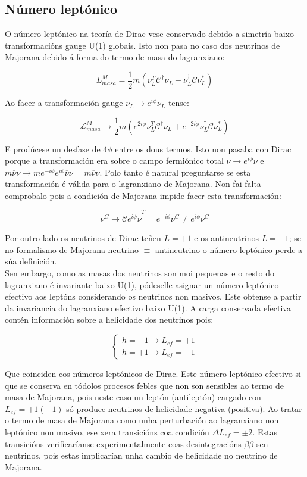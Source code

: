 \documentclass[a4paper,10pt]{article}
\newcommand{\beq}{\begin{equation}}
\newcommand{\eeq}{\end{equation}}
\newcommand{\bc}{\begin{cases}}
\newcommand{\ec}{\end{cases}}
\newcommand{\barra}[1]{\overline{#1}}
\newcommand{\h}[1]{#1^\dagger}
\newcommand{\chula}[1]{\mathcal{#1}}
\begin{document}
\subsection{Número leptónico}

O número leptónico na teoría de Dirac vese conservado debido a simetría baixo transformacións gauge U(1) globais. Isto non pasa no caso dos neutrinos de Majorana debido á forma do termo de masa do lagranxiano:

\beq
L_{masa}^M = \frac{1}{2} m \left( \nu_L^T \chula C^\dag \nu_L + \h\nu_L \chula C \nu_L^* \right)
\eeq

Ao facer a transformación gauge $\nu_L \rightarrow e^{i\phi} \nu_L$ tense:

\beq
\chula L_{masa}^M \rightarrow \frac{1}{2} m \left( e^{2i\phi} \nu_L^T \chula C^\dag \nu_L + e^{-2i\phi} \nu_L^\dag \chula C \nu_L^*\right)
\eeq

E prodúcese un desfase de $4\phi$ entre os dous termos. Isto non pasaba con Dirac porque a  transformación era sobre o campo fermiónico total $\nu \rightarrow e^{i\phi} \nu$ e $ m \barra\nu \nu \rightarrow m e^{-i\phi} e^{i\phi} \barra\nu \nu = m \barra\nu \nu$. Polo tanto é natural preguntarse se esta transformación é válida para o lagranxiano de Majorana. Non fai falta comprobalo pois a condición de Majorana impide facer esta transformación:

\beq
\nu^C \rightarrow \chula C \barra{e^{i\phi} \nu}^T = e^{-i\phi} \nu^C \neq e^{i\phi} \nu^C
\eeq

Por outro lado os neutrinos de Dirac teñen $L=+1$ e os antineutrinos $L=-1$; se no formalismo de Majorana neutrino $\equiv$ antineutrino o número leptónico perde a súa definición. \\

Sen embargo, como as masas dos neutrinos son moi pequenas e o resto do lagranxiano é invariante baixo U(1), pódeselle asignar un número leptónico efectivo aos leptóns considerando os neutrinos non masivos. Este obtense a partir da invariancia do lagranxiano efectivo baixo U(1). A carga conservada efectiva contén información sobre a helicidade dos neutrinos pois:

\beq
\bc
h=-1 \rightarrow L_{ef} = +1 \\
h=+1 \rightarrow L_{ef} = -1
\ec
\eeq

Que coinciden cos números leptónicos de Dirac. Este  número leptónico efectivo si que se conserva en tódolos procesos febles que non son sensibles ao termo de masa de Majorana, pois neste caso un leptón (antileptón) cargado con $L_{ef} = +1 (-1)$ só produce neutrinos de helicidade negativa (positiva). Ao tratar o termo de masa de Majorana como unha perturbación ao lagranxiano non leptónico non masivo, ese xera transicións coa condición $\Delta L_{ef} = \pm 2$. Estas transicións verificaríanse experimentalmente coas desintegracións $\beta\beta$ sen neutrinos, pois estas implicarían unha cambio de helicidade no neutrino de Majorana.
\end{document}
